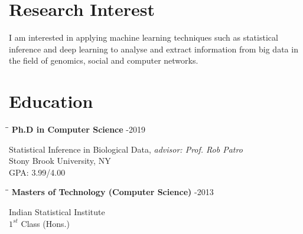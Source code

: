 \documentclass{res}
\begin{document}
\begin{resume}
\section{Research Interest}
I am interested in applying machine learning techniques such as statistical inference and deep learning to analyse and extract information from  big data in the field of genomics, social and computer networks.

\vspace{-0.2in}
\section{Education}          
  \vspace{-0.1in}	
   \begin{tabbing}
   \hspace{2.3in}\= \hspace{2.6in}\= \kill %
     {\bf Ph.D in Computer Science} \>   -2019
   \end{tabbing}  \vspace{-20pt}      %
       Statistical Inference in Biological Data, {\it advisor: Prof. Rob Patro}  \\        
       Stony Brook University, NY     \\
       GPA: 3.99/4.00
 
 
 \vspace{-0.1in}	
   \begin{tabbing}
   \hspace{2.3in}\= \hspace{2.6in}\= \kill %
     {\bf Masters of Technology (Computer Science)}  \>     -2013 
   \end{tabbing}  \vspace{-20pt}      %
       Indian Statistical Institute     \\
       $1^{st}$ Class (Hons.) 



\end{resume}
\end{document}
